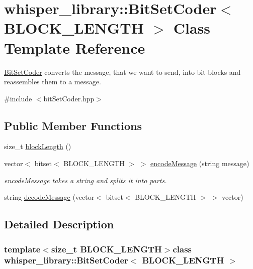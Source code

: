 \hypertarget{classwhisper__library_1_1BitSetCoder}{\section{whisper\-\_\-library\-:\-:\-Bit\-Set\-Coder$<$ \-B\-L\-O\-C\-K\-\_\-\-L\-E\-N\-G\-T\-H $>$ \-Class \-Template \-Reference}
\label{classwhisper__library_1_1BitSetCoder}
}


\hyperlink{classwhisper__library_1_1BitSetCoder}{\-Bit\-Set\-Coder} converts the message, that we want to send, into bit-\/blocks and reassembles them to a message.  




{\ttfamily \#include $<$bit\-Set\-Coder.\-hpp$>$}

\subsection*{\-Public \-Member \-Functions}
\begin{DoxyCompactItemize}
\item 
size\-\_\-t \hyperlink{classwhisper__library_1_1BitSetCoder_a78072e1d098b177ac51a7007564e8eb6}{block\-Length} ()
\item 
vector$<$ bitset$<$ \-B\-L\-O\-C\-K\-\_\-\-L\-E\-N\-G\-T\-H $>$ $>$ \hyperlink{classwhisper__library_1_1BitSetCoder_a04977549fac58c4750df77a75d4452d8}{encode\-Message} (string message)
\begin{DoxyCompactList}\small\item\em encode\-Message takes a string and splits it into parts. \end{DoxyCompactList}\item 
string \hyperlink{classwhisper__library_1_1BitSetCoder_a96721c4d4f5e5faf36873972634a03fc}{decode\-Message} (vector$<$ bitset$<$ \-B\-L\-O\-C\-K\-\_\-\-L\-E\-N\-G\-T\-H $>$ $>$ vector)
\end{DoxyCompactItemize}


\subsection{\-Detailed \-Description}
\subsubsection*{template$<$size\-\_\-t \-B\-L\-O\-C\-K\-\_\-\-L\-E\-N\-G\-T\-H$>$class whisper\-\_\-library\-::\-Bit\-Set\-Coder$<$ B\-L\-O\-C\-K\-\_\-\-L\-E\-N\-G\-T\-H $>$}

